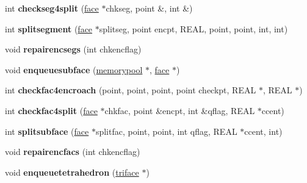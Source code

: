 \begin{DoxyCompactItemize}
\item 
\hypertarget{classtetgenmesh_a7f8037ef5cacc7b4b38c81553f2d8180}{int {\bfseries checkseg4split} (\hyperlink{classtetgenmesh_1_1face}{face} $\ast$chkseg, point \&, int \&)}\label{classtetgenmesh_a7f8037ef5cacc7b4b38c81553f2d8180}

\item 
\hypertarget{classtetgenmesh_a6394d7b4d386e8d08077c39cd8983e0e}{int {\bfseries splitsegment} (\hyperlink{classtetgenmesh_1_1face}{face} $\ast$splitseg, point encpt, R\-E\-A\-L, point, point, int, int)}\label{classtetgenmesh_a6394d7b4d386e8d08077c39cd8983e0e}

\item 
\hypertarget{classtetgenmesh_a7af360f1ae413f9e0d7803ccae55b6d6}{void {\bfseries repairencsegs} (int chkencflag)}\label{classtetgenmesh_a7af360f1ae413f9e0d7803ccae55b6d6}

\item 
\hypertarget{classtetgenmesh_aa6b6a173116973ca6ecb08f538321ebd}{void {\bfseries enqueuesubface} (\hyperlink{classtetgenmesh_1_1memorypool}{memorypool} $\ast$, \hyperlink{classtetgenmesh_1_1face}{face} $\ast$)}\label{classtetgenmesh_aa6b6a173116973ca6ecb08f538321ebd}

\item 
\hypertarget{classtetgenmesh_a7e79473a5bfee155427a924bba678fbd}{int {\bfseries checkfac4encroach} (point, point, point, point checkpt, R\-E\-A\-L $\ast$, R\-E\-A\-L $\ast$)}\label{classtetgenmesh_a7e79473a5bfee155427a924bba678fbd}

\item 
\hypertarget{classtetgenmesh_aa70e994f2091786686a9336461e5d94d}{int {\bfseries checkfac4split} (\hyperlink{classtetgenmesh_1_1face}{face} $\ast$chkfac, point \&encpt, int \&qflag, R\-E\-A\-L $\ast$ccent)}\label{classtetgenmesh_aa70e994f2091786686a9336461e5d94d}

\item 
\hypertarget{classtetgenmesh_a3a8404870ab3c2e8ce4312d48c2b29f4}{int {\bfseries splitsubface} (\hyperlink{classtetgenmesh_1_1face}{face} $\ast$splitfac, point, point, int qflag, R\-E\-A\-L $\ast$ccent, int)}\label{classtetgenmesh_a3a8404870ab3c2e8ce4312d48c2b29f4}

\item 
\hypertarget{classtetgenmesh_a701d4f317ed66df6a2e2b7b237e2386a}{void {\bfseries repairencfacs} (int chkencflag)}\label{classtetgenmesh_a701d4f317ed66df6a2e2b7b237e2386a}

\item 
\hypertarget{classtetgenmesh_a86e87c56bd1717f1741adca87cb21acb}{void {\bfseries enqueuetetrahedron} (\hyperlink{classtetgenmesh_1_1triface}{triface} $\ast$)}\label{classtetgenmesh_a86e87c56bd1717f1741adca87cb21acb}


\end{DoxyCompactItemize}
